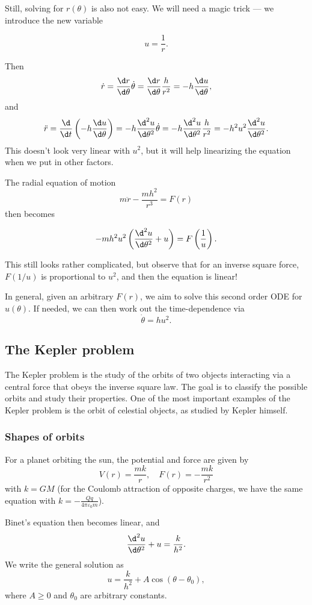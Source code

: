 \documentclass[a4paper]{article}
\begin{document}
Still, solving for $r(\theta)$ is also not easy. We will need a magic trick --- we introduce the new variable
\begin{notation}
  \[
    u = \frac{1}{r}.
  \]
\end{notation}
Then
\[
  \dot{r} = \frac{\d r}{\d \theta}\dot{\theta} = \frac{\d r}{\d \theta}\frac{h}{r^2} = -h\frac{\d u}{\d \theta},
\]
and
\[
  \ddot{r} = \frac{\d }{\d t}\left(-h \frac{\d u}{\d \theta}\right) = -h\frac{\d ^2 u}{\d \theta^2}\dot{\theta} = -h\frac{\d ^2u}{\d \theta^2}\frac{h}{r^2} = -h^2u^2\frac{\d^2 u}{\d \theta^2}.
\]
This doesn't look very linear with $u^2$, but it will help linearizing the equation when we put in other factors.

The radial equation of motion
\[
  m\ddot{r} - \frac{mh^2}{r^3} = F(r)
\]
then becomes
\begin{prop}
  \[
    -mh^2u^2\left(\frac{\d^2u}{\d \theta^2}+ u\right) = F\left(\frac{1}{u}\right).
  \]
\end{prop}
This still looks rather complicated, but observe that for an inverse square force, $F(1/u)$ is proportional to $u^2$, and then the equation is linear!

In general, given an arbitrary $F(r)$, we aim to solve this second order ODE for $u(\theta)$. If needed, we can then work out the time-dependence via
\[
  \dot{\theta} = hu^2.
\]
\subsection{The Kepler problem}
The Kepler problem is the study of the orbits of two objects interacting via a central force that obeys the inverse square law. The goal is to classify the possible orbits and study their properties. One of the most important examples of the Kepler problem is the orbit of celestial objects, as studied by Kepler himself.
\subsubsection*{Shapes of orbits}
For a planet orbiting the sun, the potential and force are given by
\[
  V(r) = \frac{mk}{r},\quad F(r) = -\frac{mk}{r^2}
\]
with $k = GM$ (for the Coulomb attraction of opposite charges, we have the same equation with $\displaystyle k = -\frac{Qq}{4\pi\varepsilon_0 m}$).

Binet's equation then becomes linear, and
\[
  \frac{\d^2 u}{\d \theta^2} + u = \frac{k}{h^2}.
\]
We write the general solution as
\[
  u = \frac{k}{h^2} + A\cos(\theta - \theta_0),
\]
where $A \geq 0$ and $\theta_0$ are arbitrary constants.
\end{document}
